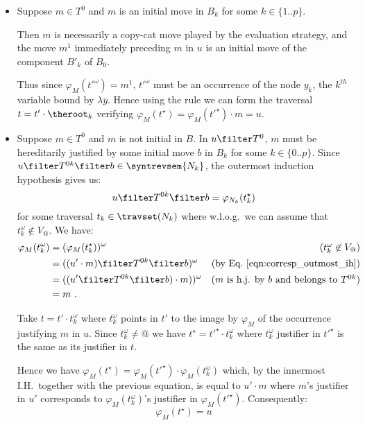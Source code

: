 \begin{itemize}[$\bullet$]
\begin{enumerate}
\begin{itemize}
    \item Suppose $m\in T^0$ and $m$ is an initial move in $B_k$ for some $k\in \{1..p\}$.

    Then $m$ is necessarily a copy-cat move played by the evaluation strategy, and the move $m^1$ immediately preceding $m$ in $u$ is an initial move of the component $B'_k$ of $B_0$.

    Thus since $\varphi_M(t'^\omega) = m^1$, $t'^\omega$ must be an occurrence of the node $y_k$, the $k^{th}$ variable bound by $\lambda \overline{y}$. Hence using the rule  we can form the traversal $t= t' \cdot \theroot_k$ verifying $\varphi_M(t^\star) = \varphi_M(t'^\star) \cdot m = u$.


    \item Suppose $m\in T^0$ and $m$ is not initial in $B$. In $u \filter T^0$, $m$ must be hereditarily justified by some initial move $b$ in $B_k$ for some $k\in \{0..p\}$. Since $u \filter T^{0k} \filter b \in \syntrevsem{N_k}$, the outermost induction hypothesis gives us:
        \begin{equation}
        u \filter T^{0k} \filter b = \varphi_{N_k}(t_k^\star)  \label{eqn:corresp_outmost_ih}
        \end{equation}
        for some traversal $t_k \in \travset(N_k)$ where w.l.o.g.\ we can assume that $t_k^\omega \not\in V_@$. We have:
        \begin{align*}
            \varphi_M (t_k^\omega) &= (\varphi_M (t_k^\star))^\omega & \mbox{($t_k^\omega \not\in V_@$)}\\
                                   &= ((u' \cdot m) \filter T^{0k}\filter b)^\omega & \mbox{(by Eq.\ \ref{eqn:corresp_outmost_ih})}\\
                                   &= ((u' \filter T^{0k}\filter b) \cdot m))^\omega & \mbox{($m$ is h.j. by $b$ and belongs to $T^{0k}$)}\\
                                   &= m \ .
        \end{align*}

        Take $t = t'\cdot t_k^\omega$ where $t_k^\omega$ points in $t'$ to the image by $\varphi_M$ of the occurrence justifying $m$ in $u$. Since $t_k^\omega \neq @$ we have  $t^\star = t'^\star \cdot t_k^\omega$ where $t_k^\omega$ justifier in $t'^\star$ is the same as its justifier in $t$.


        Hence we have $\varphi_{M}(t^\star) =  \varphi_{M}(t'^\star)  \cdot \varphi_{M}(t_k^\omega)$ which, by the innermost I.H.\ together with the previous equation, is equal to $u' \cdot m$ where $m$'s justifier in $u'$ corresponds to $\varphi_{M}(t_k^\omega)$'s justifier in $\varphi_{M}(t'^\star)$. Consequently:
        \begin{equation}
                \varphi_M(t^\star) =  u  \label{eqn:corresp_phi_t_minu_at_eq_u}
        \end{equation}
\smallskip


\end{itemize}
\end{enumerate}
\end{itemize}
